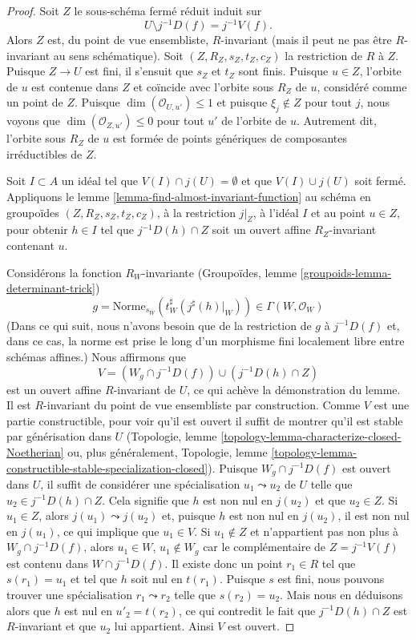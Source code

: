 \begin{proof}
\medskip\noindent
Soit $Z$ le sous-schéma fermé réduit induit sur
$$
U \setminus j^{-1}D(f) = j^{-1}V(f).
$$
Alors $Z$ est, du point de vue ensembliste,
$R$-invariant (mais il peut ne pas être $R$-invariant au sens schématique).
Soit $(Z, R_Z, s_Z, t_Z, c_Z)$ la restriction de $R$ à $Z$.
Puisque $Z \to U$ est fini, il s'ensuit que $s_Z$ et $t_Z$ sont finis.
Puisque $u \in Z$, l'orbite de $u$ est contenue dans $Z$ et coïncide avec
l'orbite sous $R_Z$ de $u$, considéré comme un point de $Z$. Puisque
$\dim(\mathcal{O}_{U, u'}) \leq 1$ et puisque $\xi_j \not \in Z$
pour tout $j$, nous voyons que $\dim(\mathcal{O}_{Z, u'}) \leq 0$ pour
tout $u'$ de l'orbite de $u$. Autrement dit, l'orbite sous $R_Z$ de $u$
est formée de points génériques de composantes irréductibles de $Z$.

\medskip\noindent
Soit $I \subset A$ un idéal tel que $V(I) \cap j(U) =\emptyset$
et que $V(I) \cup j(U)$ soit fermé. Appliquons
le lemme \ref{lemma-find-almost-invariant-function} au
schéma en groupoïdes $(Z, R_Z, s_Z, t_Z, c_Z)$, à la restriction $j|_Z$,
à l'idéal $I$ et au point $u \in Z$, pour obtenir $h \in I$ tel que
$j^{-1}D(h) \cap Z$ soit un ouvert affine $R_Z$-invariant contenant $u$.

\medskip\noindent
Considérons la fonction $R_W$-invariante (Groupoïdes, lemme
\ref{groupoids-lemma-determinant-trick})
$$
g = 
\text{Norme}_{s_W}(t_W^\sharp(j^\sharp(h)|_W)) \in \Gamma(W, \mathcal{O}_W)
$$
(Dans ce qui suit, nous n'avons besoin que de la restriction de $g$ à $j^{-1}D(f)$ et,
dans ce cas, la norme est prise le long d'un morphisme fini localement libre entre schémas affines.)
Nous affirmons que
$$
V = (W_g \cap j^{-1}D(f)) \cup (j^{-1}D(h) \cap Z)
$$
est un ouvert affine $R$-invariant de $U$, ce qui achève la démonstration du lemme.
Il est $R$-invariant du point de vue ensembliste par construction. Comme $V$ est une
partie constructible, pour voir qu'il est ouvert il suffit de montrer qu'il est
stable par générisation dans $U$ (Topologie, lemme
\ref{topology-lemma-characterize-closed-Noetherian}
ou, plus généralement,
Topologie, lemme
\ref{topology-lemma-constructible-stable-specialization-closed}).
Puisque $W_g \cap j^{-1}D(f)$ est ouvert dans $U$, il suffit de considérer
une spécialisation $u_1 \leadsto u_2$ de $U$ telle que
$u_2 \in j^{-1}D(h) \cap Z$.
Cela signifie que $h$ est non nul en $j(u_2)$ et que $u_2 \in Z$.
Si $u_1 \in Z$, alors $j(u_1) \leadsto j(u_2)$ et, puisque
$h$ est non nul en $j(u_2)$, il est non nul en $j(u_1)$, ce qui
implique que $u_1 \in V$. Si $u_1 \not \in Z$ et n'appartient pas non plus
à $W_g \cap j^{-1}D(f)$, alors $u_1 \in W$, $u_1 \not \in W_g$
car le complémentaire de $Z = j^{-1}V(f)$ est contenu dans $W \cap j^{-1}D(f)$.
Il existe donc un point $r_1 \in R$ tel que $s(r_1) = u_1$
et tel que $h$ soit nul en $t(r_1)$. Puisque $s$ est fini, nous
pouvons trouver une spécialisation $r_1 \leadsto r_2$ telle que $s(r_2) = u_2$.
Mais nous en déduisons alors que $h$ est nul en $u'_2 = t(r_2)$,
ce qui contredit le fait que $j^{-1}D(h) \cap Z$ est
$R$-invariant et que $u_2$ lui appartient. Ainsi $V$ est ouvert.


\end{proof}
